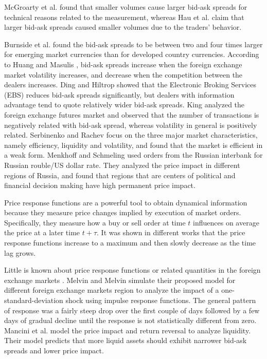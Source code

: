 McGroarty et al. \cite{micro_eff} found that smaller volumes cause larger
bid-ask spreads for technical reasons related to the measurement, whereas Hau
et al. \cite{eur_change_forex,eur_int_curr} claim that larger bid-ask spreads
caused smaller volumes due to the traders' behavior.

Burnside et al. \cite{curr_speculation} found the bid-ask spreads to be between
two and four times larger for emerging market currencies than for developed
country currencies. According to Huang and Masulis \cite{spread_competition},
bid-ask spreads increase when the foreign exchange market volatility increases,
and decrease when the competition between the dealers increases. Ding and
Hiltrop \cite{electronic_forex} showed that the Electronic Broking Services
(EBS) reduces bid-ask spreads significantly, but dealers with information
advantage tend to quote relatively wider bid-ask spreads. King
\cite{spread_futures} analyzed the foreign exchange futures market and observed
that the number of transactions is negatively related with bid-ask spread,
whereas volatility in general is positively related. Serbinenko and Rachev
\cite{intraday_forex} focus on the three major market characteristics, namely
efficiency, liquidity and volatility, and found that the market is efficient in
a weak form. Menkhoff and Schmeling \cite{local_forex} used orders from the
Russian interbank for Russian rouble/US dollar rate. They analyzed the price
impact in different regions of Russia, and found that regions that are centers
of political and financial decision making have high permanent price impact.

Price response functions are a powerful tool to obtain dynamical information
because they measure price changes implied by execution of market orders.
Specifically, they measure how a buy or sell order at time $t$ influences on
average the price at a later time $t + \tau$. It was shown in different works
\cite{components_spread_tokyo,dissecting_cross,r_walks_liquidity,subtle_nature,Bouchaud_2004,theory_market_impact,my_paper_response_financial,Wang_2016_avg,Wang_2016_cross}
that the price response functions increase to a maximum and then slowly
decrease as the time lag grows.

Little is known about price response functions or related quantities in the
foreign exchange markets
\cite{forex_liquidity,forex_volatility,response_funct_fx}. Melvin and Melvin
\cite{forex_volatility} simulate their proposed model for different foreign
exchange markets region to analyze the impact of a one-standard-deviation shock
using impulse response functions. The general pattern of response was a fairly
steep drop over the first couple of days followed by a few days of gradual
decline until the response is not statistically different from zero. Mancini et
al. \cite{forex_liquidity} model the price impact and return reversal to
analyze liquidity. Their model predicts that more liquid assets should exhibit
narrower bid-ask spreads and lower price impact.

